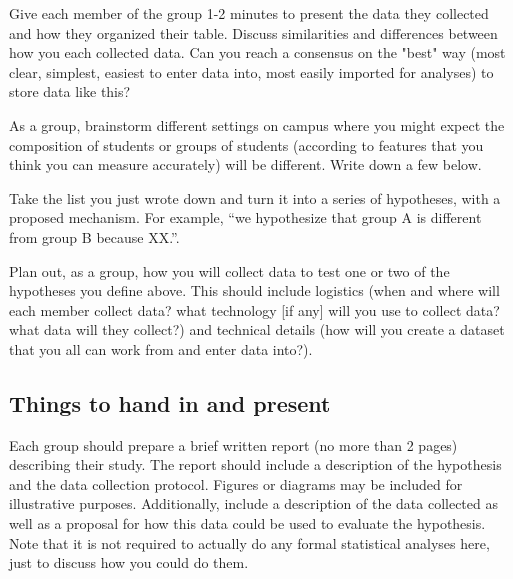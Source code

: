 \documentclass{article}\usepackage[]{graphicx}\usepackage[]{color}
\begin{document}
\begin{exercise}
Give each member of the group 1-2 minutes to present the data they collected and how they organized their table. Discuss similarities and differences between how you each collected data. Can you reach a consensus on the "best" way (most clear, simplest, easiest to enter data into, most easily imported for analyses) to store data like this?
\end{exercise}

\begin{exercise}
As a group, brainstorm different settings on campus where you might expect the composition of students or groups of students (according to features that you think you can measure accurately) will be different. Write down a few below. 
\end{exercise}

\vspace{7em}

\begin{exercise}
Take the list you just wrote down and turn it into a series of hypotheses, with a proposed mechanism. For example, ``we hypothesize that group A is different from group B because XX.''.
\end{exercise}

\vspace{7em}

\begin{exercise}
Plan out, as a group, how you will collect data to test one or two of the hypotheses you define above. This should include logistics (when and where will each member collect data? what technology [if any] will you use to collect data? what data will they collect?) and technical details (how will you create a dataset that you all can work from and enter data into?).
\end{exercise}


\subsection*{Things to hand in and present}

Each group should prepare a brief written report (no more than 2 pages) describing their study. The report should include a description of the hypothesis and the data collection protocol. Figures or diagrams may be included for illustrative purposes. Additionally, include a description of the data collected as well as a proposal for how this data could be used to evaluate the hypothesis. Note that it is not required to actually do any formal statistical analyses here, just to discuss how you could do them. 
\end{document}
